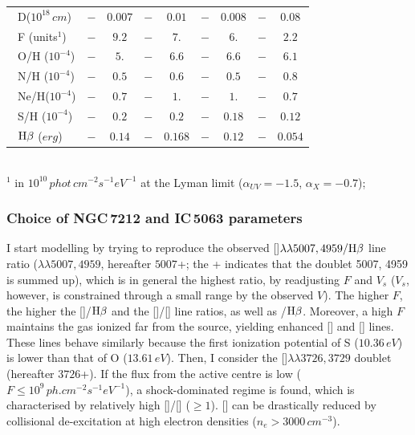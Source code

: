 \documentclass[../main.tex]{subfiles}
\begin{document}
\begin{table}
\begin{tabular}{lcccccccc}
\ D($10^{18}\,\si{cm}$)      &$-      $&$ 0.007$&$-    $&$0.01  $&$-     $&$0.008 $&$-     $&$0.08  $\\            
\ F (units$^1$)       &$-      $&$ 9.2  $&$-    $&$7.    $&$-     $&$6.    $&$-    $&$2.2     $\\            
\ O/H ($10^{-4}$)     &$-      $&$ 5.   $&$-    $&$6.6   $&$-     $&$6.6   $&$-     $&$6.1     $\\            
\ N/H ($10^{-4}$)     &$-      $&$ 0.5  $&$-    $&$0.6   $&$-     $&$0.5   $&$-     $&$0.8     $\\            
\ Ne/H($10^{-4}$)     &$-      $&$ 0.7  $&$-    $&$1.    $&$-     $&$1.    $&$-     $&$0.7    $\\            
\ S/H ($10^{-4}$)     &$-      $&$ 0.2  $&$-    $&$0.2   $&$-     $&$0.18  $&$-     $&$0.12    $\\            
\ $\rm H\beta$ ($\si{erg}$)          &$-      $&$0.14  $&$-    $&$0.168 $&$-     $&$0.12  $&$-     $&$0.054   $\\            
\hline
\end{tabular}
\\
$^1$ in $10^{10}\,\si{phot\,cm^{-2} s^{-1} eV^{-1}}$ at the Lyman limit
(${\alpha}_{UV}=-1.5$, ${\alpha}_X=-0.7$);

\end{table}

\subsubsection{Choice of  NGC\,7212 and IC\,5063 parameters}
\label{sec:parameters}

I start modelling by trying to reproduce the observed []$\lambda\lambda5007,4959/\rm H\beta$ line ratio ($\lambda\lambda5007,4959$, hereafter $5007$+; the + indicates that the doublet 5007, 4959 is summed up), which is in general  the highest  ratio, by readjusting $F$ and $V_s$ ($V_s$, however, is constrained through a small range by the observed $V$). 
The higher $F$, the higher the []/$\rm H\beta$ and the []/[] line ratios, as well as /$\rm H\beta$. 
Moreover, a high $F$ maintains the gas ionized far from the source, yielding enhanced [] and [] lines. 
These lines behave similarly because the first ionization potential of S ($10.36\,\si{ eV}$) is lower than that of O ($13.61\,\si{ eV}$).
Then, I consider the []$\lambda\lambda3726,3729$ doublet (hereafter $3726$+). 
If the flux from the active centre is low ($F \leq 10^9\,\si{ph.cm^{-2} s^{-1} eV^{-1}}$), a shock-dominated regime is found, which is characterised by relatively high []/[] ($\geq 1$). 
[] can be drastically reduced by collisional de-excitation at high electron densities ($n_e >  3000\,\si{cm^{-3}}$).
\end{document}
